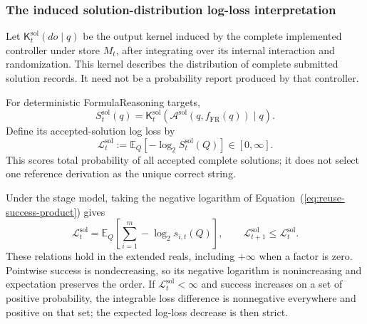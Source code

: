 \documentclass[10pt]{article} %
\renewcommand{\eqref}[1]{\textup{(\ref{#1})}}
\providecommand{\1}{\mathbf{1}}  %
\theoremstyle{remark}
\theoremstyle{definition}
\begin{document}
\subsubsection{The induced solution-distribution log-loss interpretation}
\label{subsubsec:reuse-log-loss}

Let $\mathsf K_t^{\mathrm{sol}}(do\mid q)$ be the output kernel induced by the complete
implemented controller under store $M_t$, after integrating over its
internal interaction and randomization. This kernel describes the
distribution of complete submitted solution records. It need not be a
probability report produced by that controller.

For deterministic FormulaReasoning targets,
\[
S_t^{\mathrm{sol}}(q)
=\mathsf K_t^{\mathrm{sol}}\!\left(\mathcal A^{\mathrm{sol}}
(q,f_{\mathrm{FR}}(q))\mid q\right).
\]
Define its accepted-solution log loss by
\begin{equation}
\mathcal L_t^{\mathrm{sol}}
:=
\mathbb E_Q[-\log_2 S_t^{\mathrm{sol}}(Q)]
\in[0,\infty].
\label{eq:reuse-induced-log-loss}
\end{equation}
This scores total probability of all accepted complete solutions; it
does not select one reference derivation as the unique correct string.

Under the stage model, taking the negative logarithm of
Equation~\eqref{eq:reuse-success-product} gives
\begin{equation}
\mathcal L_t^{\mathrm{sol}}
=\mathbb E_Q\!\left[\sum_{i=1}^{m}-\log_2s_{i,t}(Q)\right],
\qquad
\mathcal L_{t+1}^{\mathrm{sol}}\leq\mathcal L_t^{\mathrm{sol}}.
\label{eq:reuse-log-loss-monotonicity}
\end{equation}
These relations hold in the extended reals, including $+\infty$ when a
factor is zero. Pointwise success is nondecreasing, so its negative
logarithm is nonincreasing and expectation preserves the order. If
$\mathcal L_t^{\mathrm{sol}}<\infty$ and success increases on a set of
positive probability, the integrable loss difference is nonnegative
everywhere and positive on that set; the expected log-loss decrease is
then strict.
\end{document}
